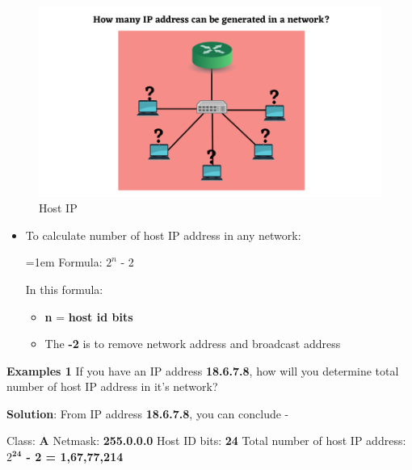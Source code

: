 \setlength{\columnsep}{3pt}
\begin{flushleft}

\begin{figure}[h!]
	\centering
	\includegraphics[scale=.7]{content/chapter14/images/how_many.png}
	\caption{Host IP}
	\label{fig:localhost}
\end{figure}	

\begin{itemize}
	\item To calculate number of host IP address in any network:
	\bigskip
	\begin{tcolorbox}[breakable,notitle,boxrule=-0pt,colback=yellow,colframe=yellow]
		\color{black}
		\font=1em
		Formula: $2^n$ - 2
		\font=4pt
	\end{tcolorbox}
	In this formula:
	\begin{itemize}
		\item 	\textbf{n} = \textbf{host id bits}
		\item The \textbf{-2} is to remove network address and broadcast address
	\end{itemize}
\end{itemize}


\newpage
\textbf{Examples 1}
\newline
If you have an IP address \textbf{18.6.7.8}, how will you determine total number of host IP address in it's network?	

\textbf{Solution}: From IP address \textbf{18.6.7.8}, you can conclude -
\begin{tcolorbox}[breakable,notitle,boxrule=-0pt,colback=pink,colframe=pink]	
	\color{black}
	Class: \textbf{A}
	\newline
	Netmask: \textbf{255.0.0.0}
	\newline
	Host ID bits: \textbf{24}
	\newline
	Total number of host IP address: \textbf{$2^\textbf{24}$ - 2 = 1,67,77,214}
\end{tcolorbox}


\end{flushleft}
